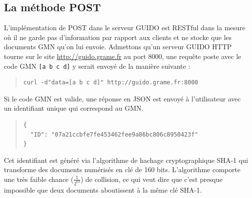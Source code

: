 \documentclass{article}
\newcommand{\verburl}[1]{
\begin{quote}
\begingroup
\fontsize{7.5pt}{12pt}\selectfont
#1
\endgroup
\end{quote}
}
\newcommand{\guidosize}{7pt}
\begin{document}
\subsection{La méthode POST}\label{subsection:post}
L'implémentation de POST dans le serveur GUIDO est RESTful dans la mesure où il ne garde pas d'information par rapport aux clients et ne stocke que les documents GMN qu'on lui envoie.
Admettons qu'un serveur GUIDO HTTP tourne sur le site \url{http://guido.grame.fr} au port 8000, une requête poste avec le code GMN \verb=[a b c d]= y serait envoyé de la manière suivante :
\begin{quote}
\begingroup
\fontsize{\guidosize}{12pt}\selectfont
\begin{verbatim}
curl -d"data=[a b c d]" http://guido.grame.fr:8000
\end{verbatim}
\endgroup
\end{quote}
Si le code GMN est valide, une réponse en JSON est envoyé à l'utilisateur avec un identifiant unique qui correspond au GMN.
\begin{quote}
\begingroup
\fontsize{\guidosize}{12pt}\selectfont
\begin{verbatim}
{
  "ID": "07a21ccbfe7fe453462fee9a86bc806c8950423f"
}
\end{verbatim}
\endgroup
\end{quote}
Cet identifiant est généré via l'algorithme de hachage cryptographique SHA-1 \cite{sha1} qui transforme des documents numérisés en clé de 160 bits. L'algorithme comporte une très faible chance ($\frac{1}{2^{63}}$) de \og{}collision\fg{}, ce qui veut dire que c'est presque impossible que deux documents aboutissent à la même clé SHA-1. 
\end{document}
